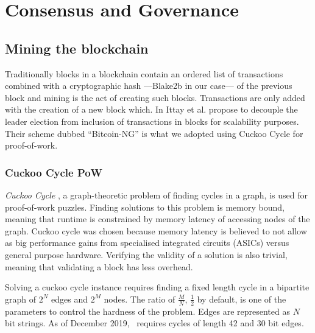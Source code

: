 \section{Consensus and Governance}

\subsection{Mining the blockchain}
\label{sect:mining}

Traditionally blocks in a blockchain contain an ordered list of transactions
combined with a cryptographic hash ---Blake2b \cite{aumasson2013blake2} in our
case--- of the previous block \cite{whatisablockchain,raikwar2019sok} and mining
is the act of creating such blocks. Transactions are only added with the
creation of a new block which. In \cite{Eyal:2016:BSB:2930611.2930615}
Ittay et al. propose to decouple the leader election from inclusion of
transactions in blocks for scalability purposes. Their scheme dubbed
\enquote{Bitcoin-NG} is what we adopted using Cuckoo Cycle for proof-of-work.



\subsubsection{Cuckoo Cycle PoW}

\textit{Cuckoo Cycle} \cite{Tromp2015CuckooCA}, a graph-theoretic problem of
finding cycles in a graph, is used for proof-of-work puzzles. Finding solutions
to this problem is memory bound, meaning that runtime is constrained by memory
latency of accessing nodes of the graph. Cuckoo cycle was chosen because memory
latency is believed to not allow as big performance gains from specialised
integrated circuits (ASICs) versus general purpose hardware. Verifying the
validity of a solution is also trivial, meaning that validating a block has
less overhead.

Solving a cuckoo cycle instance requires finding a fixed length cycle in a
bipartite graph of $2^N$ edges and $2^M$ nodes. The ratio of $\frac{M}{N}$,
$\frac{1}{2}$ by default, is one of the parameters to control the hardness of
the problem. Edges are represented as $N$ bit strings.
As of December 2019, \aet\ requires cycles of length 42 and 30 bit edges.

